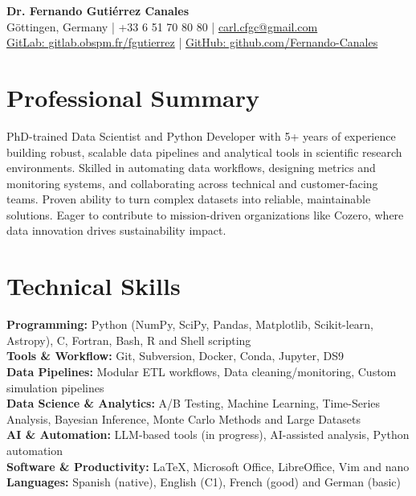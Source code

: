 \documentclass[10pt,a4paper]{article}
\begin{document}
\begin{center}
    {\Huge \textbf{Dr. Fernando Gutiérrez Canales}}\\
    Göttingen, Germany \quad | \quad +33 6 51 70 80 80 \quad | \quad \href{mailto:carl.cfgc@gmail.com}{carl.cfgc@gmail.com} \\
    \href{https://gitlab.obspm.fr/fgutierrez}{GitLab: gitlab.obspm.fr/fgutierrez} \quad | \quad \href{https://github.com/Fernando-Canales}{GitHub: github.com/Fernando-Canales}
\end{center}

\vspace{1em}

\section*{Professional Summary}
PhD-trained Data Scientist and Python Developer with 5+ years of experience building robust, scalable data pipelines and analytical tools in scientific research environments. Skilled in automating data workflows, designing metrics and monitoring systems, and collaborating across technical and customer-facing teams. Proven ability to turn complex datasets into reliable, maintainable solutions. Eager to contribute to mission-driven organizations like Cozero, where data innovation drives sustainability impact.

\section*{Technical Skills}
\textbf{Programming:} Python (NumPy, SciPy, Pandas, Matplotlib, Scikit-learn, Astropy), C, Fortran, Bash, R and Shell scripting \\
\textbf{Tools \& Workflow:} Git, Subversion, Docker, Conda, Jupyter, DS9 \\
\textbf{Data Pipelines:} Modular ETL workflows, Data cleaning/monitoring, Custom simulation pipelines \\
\textbf{Data Science \& Analytics:} A/B Testing, Machine Learning, Time-Series Analysis, Bayesian Inference, Monte Carlo Methods and Large Datasets \\
\textbf{AI \& Automation:} LLM-based tools (in progress), AI-assisted analysis, Python automation \\
\textbf{Software \& Productivity:} LaTeX, Microsoft Office, LibreOffice, Vim and nano \\
\textbf{Languages:} Spanish (native), English (C1), French (good) and German (basic) 
\end{document}
